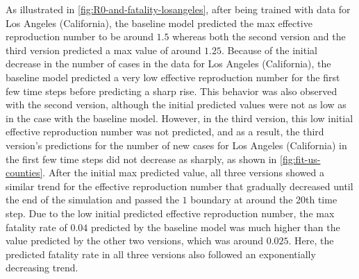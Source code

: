As illustrated in \autoref{fig:R0-and-fatality-losangeles}, after being trained with data for Los Angeles (California), the baseline model predicted the max effective reproduction number to be around $1.5$ whereas both the second version and the third version predicted a max value of around $1.25$.
Because of the initial decrease in the number of cases in the data for Los Angeles (California), the baseline model predicted a very low effective reproduction number for the first few time steps before predicting a sharp rise.
This behavior was also observed with the second version, although the initial predicted values were not as low as in the case with the baseline model.
However, in the third version, this low initial effective reproduction number was not predicted, and as a result, the third version's predictions for the number of new cases for Los Angeles (California) in the first few time steps did not decrease as sharply, as shown in \autoref{fig:fit-us-counties}.
After the initial max predicted value, all three versions showed a similar trend for the effective reproduction number that gradually decreased until the end of the simulation and passed the $1$ boundary at around the 20th time step.
Due to the low initial predicted effective reproduction number, the max fatality rate of $0.04$ predicted by the baseline model was much higher than the value predicted by the other two versions, which was around $0.025$.
Here, the predicted fatality rate in all three versions also followed an exponentially decreasing trend.

